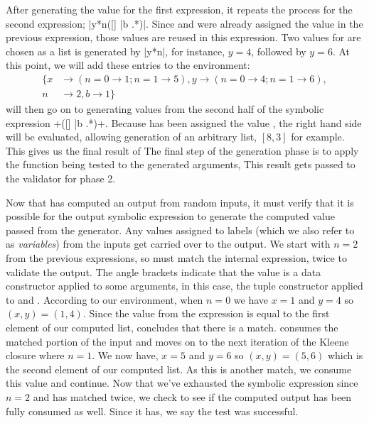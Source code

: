 After generating the value for the first expression, it repeats the process for the second expression; \hskin|y*{n}([] |{b} .*)|.
Since  and  were already assigned the value in the previous expression, those values are reused in this expression. 
Two values for  are chosen as
a list is generated by \hskin|y*{n}|,
for instance, $y = 4$, followed by $y = 6$.
At this point, we will add these entries to the environment:
\begin{align*}
\{ x &\rightarrow (n = 0 \rightarrow 1; n = 1 \rightarrow 5), y \rightarrow (n = 0 \rightarrow 4; n = 1 \rightarrow 6), \\
  n &\rightarrow 2, b \rightarrow 1 \}
\end{align*}
\ourDSL will then go on to generating values
from the second half of the symbolic expression
\hskin+([] |{b} .*)+.
Because  has been assigned the value ,
the right hand side will be evaluated,
allowing generation of an arbitrary list,
$[8, 3]$ for example.
This gives us the final result of \hskin{[4, 6] ++ [8, 3] = [4, 6, 8, 3]}
The final step of the generation phase is to apply the function
being tested
to the generated arguments, 
This result gets passed to the validator for phase 2.

Now that \ourDSL has computed an output from random inputs, 
it must verify that it is possible for the output symbolic expression to generate the computed value passed from the generator.
Any values assigned to labels
(which we also refer to as \textit{variables})
from the inputs get carried over to the output.
We start with $n=2$ from the previous expressions, 
so \ourDSL must match the internal expression,  twice to validate the output.
The angle brackets indicate that the value is a data constructor applied to some arguments,
in this case, the tuple constructor applied to  and .
According to our environment, when $n=0$ we have $x=1$ and $y=4$ 
so $(x, y)=(1,4)$.
Since the value from the expression is equal to the first element of our computed list, \ourDSL concludes that there is a match.
\ourDSL consumes the matched portion of the input and moves on to the next iteration of the Kleene closure where $n=1$.
We now have, $x=5$ and $y=6$ so $(x, y)=(5, 6)$ which is the second element of our computed list.
As this is another match, we consume this value and continue.
Now that we've exhausted the symbolic expression since $n=2$ and \ourDSL has
matched twice, we check to see if the computed output has been fully consumed
as well. Since it has, we say the test was successful.